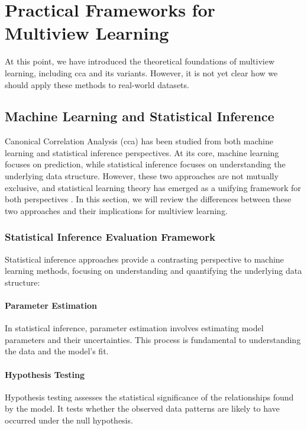 \section{Practical Frameworks for Multiview Learning}

At this point, we have introduced the theoretical foundations of multiview learning, including \acrshort{cca} and its variants.
However, it is not yet clear how we should apply these methods to real-world datasets.

\subsection{Machine Learning and Statistical Inference}

Canonical Correlation Analysis (\acrshort{cca}) has been studied from both machine learning and statistical inference perspectives.
At its core, machine learning focuses on prediction, while statistical inference focuses on understanding the underlying data structure\citep{ij2018statistics}.
However, these two approaches are not mutually exclusive, and statistical learning theory has emerged as a unifying framework for both perspectives \citep{vapnik1999nature, hastie2009elements}.
In this section, we will review the differences between these two approaches and their implications for multiview learning.

\subsubsection{Statistical Inference Evaluation Framework}

Statistical inference approaches provide a contrasting perspective to machine learning methods, focusing on understanding and quantifying the underlying data structure:

\paragraph{Parameter Estimation}

In statistical inference, parameter estimation involves estimating model parameters and their uncertainties.
This process is fundamental to understanding the data and the model's fit.

\paragraph{Hypothesis Testing}

Hypothesis testing assesses the statistical significance of the relationships found by the model.
It tests whether the observed data patterns are likely to have occurred under the null hypothesis.


